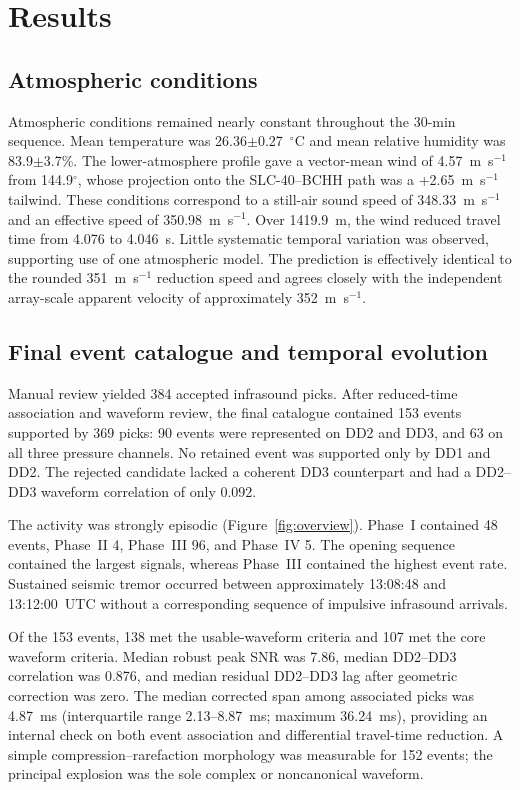 \documentclass[]{seismica}
\begin{document}
\section{Results}
\label{sec:results}

\subsection{Atmospheric conditions}
\label{sec:results_atmosphere}

Atmospheric conditions remained nearly constant throughout the 30-min
sequence. Mean temperature was 26.36$\pm$0.27~$^\circ$C and mean relative
humidity was 83.9$\pm$3.7\%. The lower-atmosphere profile gave a vector-mean
wind of 4.57~m~s$^{-1}$ from 144.9$^\circ$, whose projection onto the
SLC-40--BCHH path was a +2.65~m~s$^{-1}$ tailwind. These conditions correspond
to a still-air sound speed of 348.33~m~s$^{-1}$ and an effective speed of
350.98~m~s$^{-1}$. Over 1419.9~m, the wind reduced travel time from 4.076 to
4.046~s. Little systematic temporal variation was observed, supporting use of
one atmospheric model. The prediction is effectively identical to the rounded
351~m~s$^{-1}$ reduction speed and agrees closely with the independent
array-scale apparent velocity of approximately 352~m~s$^{-1}$.


\subsection{Final event catalogue and temporal evolution}
\label{sec:results_catalogue}

Manual review yielded 384 accepted infrasound picks. After reduced-time
association and waveform review, the final catalogue contained 153 events
supported by 369 picks: 90 events were represented on DD2 and DD3, and 63 on
all three pressure channels. No retained event was supported only by DD1 and
DD2. The rejected candidate lacked a coherent DD3 counterpart and had a
DD2--DD3 waveform correlation of only 0.092.

The activity was strongly episodic (Figure~\ref{fig:overview}). Phase~I
contained 48 events, Phase~II 4, Phase~III 96, and Phase~IV 5. The opening
sequence contained the largest signals, whereas Phase~III contained the
highest event rate. Sustained seismic tremor occurred between approximately
13:08:48 and 13:12:00~UTC without a corresponding sequence of impulsive
infrasound arrivals.

Of the 153 events, 138 met the usable-waveform criteria and 107 met the core
waveform criteria. Median robust peak SNR was 7.86, median DD2--DD3 correlation
was 0.876, and median residual DD2--DD3 lag after geometric correction was
zero. The median corrected span among associated picks was 4.87~ms
(interquartile range 2.13--8.87~ms; maximum 36.24~ms), providing an internal
check on both event association and differential travel-time reduction. A
simple compression--rarefaction morphology was measurable for 152 events; the
principal explosion was the sole complex or noncanonical waveform.
\end{document}
